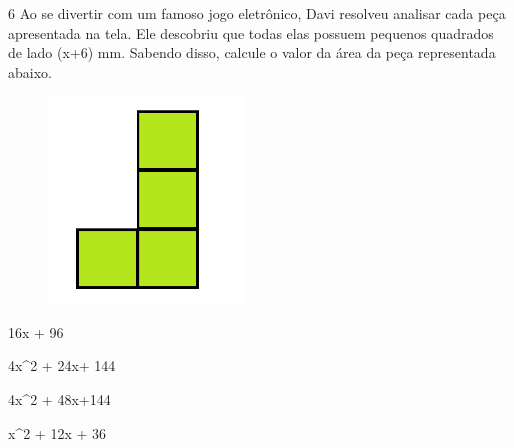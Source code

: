 












\num{6} Ao se divertir com um famoso jogo eletrônico, Davi resolveu analisar
cada peça apresentada na tela. Ele descobriu que todas elas possuem
pequenos quadrados de lado (x+6) mm. Sabendo disso, calcule o valor da
área da peça representada abaixo.

\begin{figure}[H]
\centering\includegraphics[width=2.05833in,height=2.16573in]{./imgSAEB_8_MAT/media/image57.png}
\end{figure}
\item 16x + 96
\item 4x^2 + 24x+ 144
\item 4x^2 + 48x+144
\item x^2 + 12x + 36



